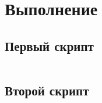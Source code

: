 \section{Выполнение}
\subsection{Первый скрипт}
\inputminted[mathescape,
               linenos,
               tabsize=2,
               breaklines]{sh}{listings/first.sh}
\subsection{Второй скрипт}
\inputminted[mathescape,
               linenos,
               tabsize=2,
               breaklines]{sh}{listings/second.sh}
